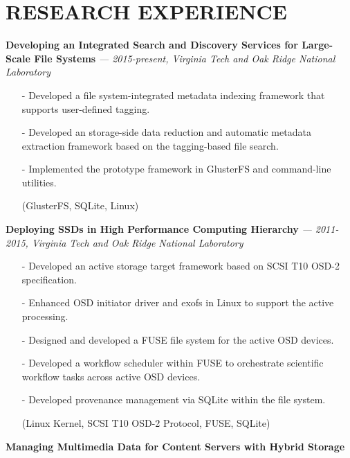 \section{RESEARCH EXPERIENCE} 
\vspace{0.03in}
  {\bf Developing an Integrated Search and Discovery Services for Large-Scale File Systems}
   {\it \footnotesize --- 2015-present, Virginia Tech and Oak Ridge National Laboratory}
   \begin{itemize}[leftmargin=*]
    \setlength\itemsep{-0.02in}
    \item[-] Developed a file system-integrated metadata indexing framework
	     that supports user-defined tagging.
    \item[-] Developed an storage-side data reduction and automatic metadata
	     extraction framework based on the tagging-based file search.
    \item[-] Implemented the prototype framework in GlusterFS and command-line utilities.
    \item[] {\small(GlusterFS, SQLite, Linux)}
   \end{itemize}
  \vspace{-0.15in}
  {\bf Deploying SSDs in High Performance Computing Hierarchy}
    {\it \footnotesize --- 2011-2015, Virginia Tech and Oak Ridge National Laboratory}
    \begin{itemize}[leftmargin=*]
    \setlength\itemsep{-0.02in}
    \item[-] Developed an active storage target framework based on SCSI T10 OSD-2
    specification.
    \item[-] Enhanced OSD initiator driver and exofs in Linux to support the active
    processing.
    \item[-] Designed and developed a FUSE file system for the active OSD devices.
    \item[-] Developed a workflow scheduler within FUSE to orchestrate scientific
    workflow tasks across active OSD devices.
    \item[-] Developed provenance management via SQLite within the file system.
    \item[] {\small(Linux Kernel, SCSI T10 OSD-2 Protocol, FUSE, SQLite)}
    \end{itemize}
  \vspace{-0.15in}
  {\bf Managing Multimedia Data for Content Servers with Hybrid Storage}
